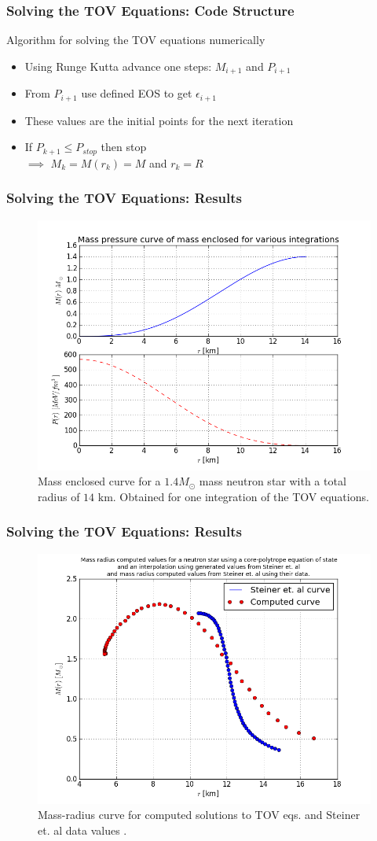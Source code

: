 \documentclass{beamer}
\begin{document}
\begin{frame}
\frametitle{Solving the TOV Equations: Code Structure}
Algorithm for solving the TOV equations numerically
\begin{itemize}
\item Using Runge Kutta advance one steps: $M_{i+1}$ and $P_{i+1}$
\item From $P_{i+1}$ use defined EOS to get $\epsilon_{i+1}$
\item These values are the initial points for the next iteration
\item If $P_{k+1} \le P_{stop}$ then stop \\
$\implies$ $M_k = M(r_k) = M$ and $r_k = R$
\end{itemize}
\end{frame}
\begin{frame}
\frametitle{Solving the TOV Equations: Results}
\begin{figure}
\includegraphics[width=0.6\linewidth]{figs/14mass.png}
\caption{Mass enclosed curve for a $1.4 M_\odot$ mass neutron star with a total radius of $14$ $\textrm{km}$. Obtained for one integration of the TOV equations.}
\end{figure}
\end{frame}
\begin{frame}
\frametitle{Solving the TOV Equations: Results}
\begin{figure}
\includegraphics[width=0.6\linewidth]{figs/mestein.png}
\caption{Mass-radius curve for computed solutions to TOV eqs. and Steiner et. al data values \cite{steiner2010}.}
\end{figure}
\end{frame}
\end{document}
